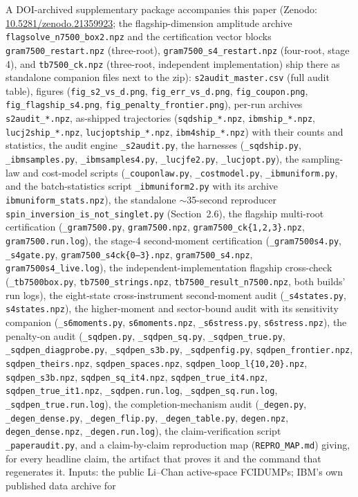 \documentclass[11pt]{article}
\begin{document}
\begin{sloppypar}
A DOI-archived supplementary package accompanies this paper (Zenodo: \href{https://doi.org/10.5281/zenodo.21359923}{10.5281/zenodo.21359923}; the flagship-dimension amplitude archive \texttt{flagsolve\_n7500\_box2.npz} and the certification vector blocks \texttt{gram7500\_restart.npz} (three-root), \texttt{gram7500\_s4\_restart.npz} (four-root, stage 4), and \texttt{tb7500\_ck.npz} (three-root, independent implementation) ship there as standalone companion files next to the zip): \texttt{s2audit\_master.csv} (full audit table), figures (\texttt{fig\_s2\_vs\_d.png}, \texttt{fig\_err\_vs\_d.png}, \texttt{fig\_coupon.png}, \texttt{fig\_flagship\_s4.png}, \texttt{fig\_penalty\_frontier.png}), per-run archives \texttt{s2audit\_*.npz}, as-shipped trajectories (\texttt{sqdship\_*.npz}, \texttt{ibmship\_*.npz}, \texttt{lucj2ship\_*.npz}, \texttt{lucjoptship\_*.npz}, \texttt{ibm4ship\_*.npz}) with their counts and statistics, the audit engine \texttt{\_s2audit.py}, the harnesses (\texttt{\_sqdship.py}, \texttt{\_ibmsamples.py}, \texttt{\_ibmsamples4.py}, \texttt{\_lucjfe2.py}, \texttt{\_lucjopt.py}), the sampling-law and cost-model scripts (\texttt{\_couponlaw.py}, \texttt{\_costmodel.py}, \texttt{\_ibmuniform.py}, and the batch-statistics script \texttt{\_ibmuniform2.py} with its archive \texttt{ibmuniform\_stats.npz}), the standalone $\sim$35-second reproducer \texttt{spin\_inversion\_is\_not\_singlet.py} (Section~2.6), the flagship multi-root certification (\texttt{\_gram7500.py}, \texttt{gram7500.npz}, \texttt{gram7500\_ck\{1,2,3\}.npz}, \texttt{gram7500.run.log}), the stage-4 second-moment certification (\texttt{\_gram7500s4.py}, \texttt{\_s4gate.py}, \texttt{gram7500\_s4ck\{0--3\}.npz}, \texttt{gram7500\_s4.npz}, \texttt{gram7500s4\_live.log}), the independent-implementation flagship cross-check (\texttt{\_tb7500box.py}, \texttt{tb7500\_strings.npz}, \texttt{tb7500\_result\_n7500.npz}, both builds' run logs), the eight-state cross-instrument second-moment audit (\texttt{\_s4states.py}, \texttt{s4states.npz}), the higher-moment and sector-bound audit with its sensitivity companion (\texttt{\_s6moments.py}, \texttt{s6moments.npz}, \texttt{\_s6stress.py}, \texttt{s6stress.npz}), the penalty-on audit (\texttt{\_sqdpen.py}, \texttt{\_sqdpen\_sq.py}, \texttt{\_sqdpen\_true.py}, \texttt{\_sqdpen\_diagprobe.py}, \texttt{\_sqdpen\_s3b.py}, \texttt{\_sqdpenfig.py}, \texttt{sqdpen\_frontier.npz}, \texttt{sqdpen\_theirs.npz}, \texttt{sqdpen\_spaces.npz}, \texttt{sqdpen\_loop\_l\{10,20\}.npz}, \texttt{sqdpen\_s3b.npz}, \texttt{sqdpen\_sq\_it4.npz}, \texttt{sqdpen\_true\_it4.npz}, \texttt{sqdpen\_true\_it1.npz}, \texttt{\_sqdpen.run.log}, \texttt{\_sqdpen\_sq.run.log}, \texttt{\_sqdpen\_true.run.log}), the completion-mechanism audit (\texttt{\_degen.py}, \texttt{\_degen\_dense.py}, \texttt{\_degen\_flip.py}, \texttt{\_degen\_table.py}, \texttt{degen.npz}, \texttt{degen\_dense.npz}, \texttt{\_degen.run.log}), the claim-verification script \texttt{\_paperaudit.py}, and a claim-by-claim reproduction map (\texttt{REPRO\_MAP.md}) giving, for every headline claim, the artifact that proves it and the command that regenerates it. Inputs: the public Li--Chan active-space FCIDUMPs; IBM's own published data archive for 
\end{sloppypar}
\end{document}
